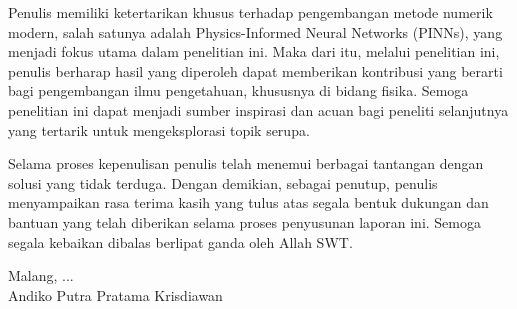 Penulis memiliki ketertarikan khusus terhadap pengembangan metode numerik modern, salah satunya adalah Physics-Informed Neural Networks (PINNs), yang menjadi fokus utama dalam penelitian ini.  Maka dari itu, melalui penelitian ini, penulis berharap hasil yang diperoleh dapat memberikan kontribusi yang berarti bagi pengembangan ilmu pengetahuan, khususnya di bidang fisika. Semoga penelitian ini dapat menjadi sumber inspirasi dan acuan bagi peneliti selanjutnya yang tertarik untuk mengeksplorasi topik serupa.

Selama proses kepenulisan penulis telah menemui berbagai tantangan dengan solusi yang tidak terduga. Dengan demikian, sebagai penutup, penulis menyampaikan rasa terima kasih yang tulus atas segala bentuk dukungan dan bantuan yang telah diberikan selama proses penyusunan laporan ini. Semoga segala kebaikan dibalas berlipat ganda oleh Allah SWT.

\begin{flushright}
	Malang, ...\\
	\vspace{1.5cm}
	Andiko Putra Pratama Krisdiawan
\end{flushright}
\cleardoublepage
